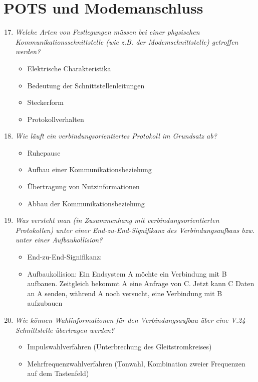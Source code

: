 \documentclass[hidelinks]{article}
\begin{document}
\section{POTS und Modemanschluss}
\begin{enumerate}
\setcounter{enumi}{16}
\item \textit{Welche Arten von Festlegungen müssen bei einer physischen Kommunikationsschnittstelle	(wie z.B. der Modemschnittstelle) getroffen werden?}

\begin{itemize}
\item Elektrische Charakteristika
\item Bedeutung der Schnittstellenleitungen
\item Steckerform
\item Protokollverhalten
\end{itemize}

\item \textit{Wie läuft ein verbindungsorientiertes Protokoll im Grundsatz ab?}

\begin{itemize}
\item Ruhepause
\item Aufbau einer Kommunikationsbeziehung
\item Übertragung von Nutzinformationen
\item Abbau der Kommunikationsbeziehung
\end{itemize}

\item \textit{Was versteht man (in Zusammenhang mit verbindungsorientierten Protokollen) unter einer End-zu-End-Signifikanz des Verbindungsaufbaus bzw. unter einer Aufbaukollision?}

\begin{itemize}
\item End-zu-End-Signifikanz: %
\item Aufbaukollision: Ein Endsystem A möchte ein Verbindung mit B aufbauen. Zeitgleich bekommt A eine Anfrage von C. Jetzt kann C Daten an A senden, während A noch versucht, eine Verbindung mit B aufzubauen
\end{itemize}

\item \textit{Wie können Wahlinformationen für den Verbindungsaufbau über eine V.24-Schnittstelle übertragen werden?}

\begin{itemize}
\item Impulswahlverfahren (Unterbrechung des Gleitstromkreises)
\item Mehrfrequenzwahlverfahren (Tonwahl, Kombination zweier Frequenzen auf dem Tastenfeld)
\end{itemize}


\end{enumerate}
\end{document}

